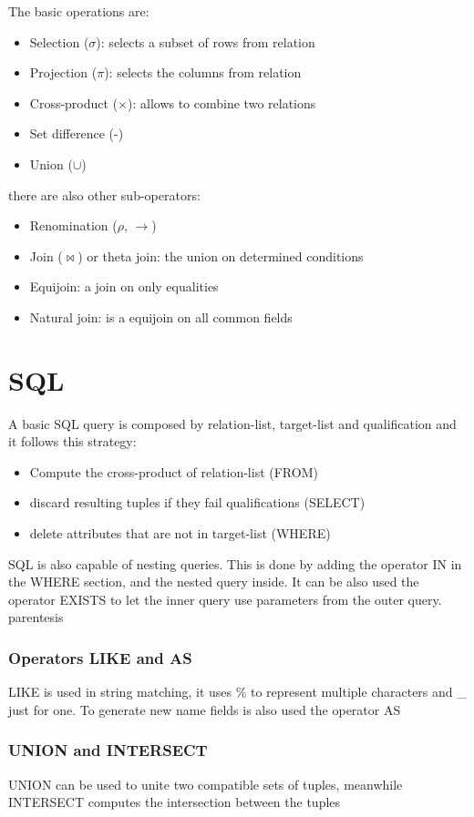 \documentclass[12pt, a4paper]{article}
\begin{document}
The basic operations are:
\begin{itemize}
    \item Selection ($\sigma$): selects a subset of rows from relation 
    \item Projection ($\pi$): selects the columns from relation
    \item Cross-product ($\times$): allows to combine two relations
    \item Set difference (-) 
    \item Union ($\cup$)
\end{itemize}
there are also other sub-operators:
\begin{itemize}
    \item Renomination ($\rho$, $\rightarrow$)
    \item Join ($\Join$) or theta join: the union on determined conditions
    \item Equijoin: a join on only equalities
    \item Natural join: is a equijoin on all common fields
\end{itemize}

\newpage
\section{SQL}
A basic SQL query is composed by relation-list, target-list and qualification and it follows this strategy:
\begin{itemize}
    \item Compute the cross-product of relation-list (FROM)
    \item discard resulting tuples if they fail qualifications (SELECT)
    \item delete attributes that are not in target-list (WHERE)
\end{itemize}
SQL is also capable of nesting queries. This is done by adding the operator IN in the WHERE section, and the nested 
query inside. It can be also used the operator EXISTS to let the inner query use parameters from the outer query. 
parentesis

\subsubsection{Operators LIKE and AS}
LIKE is used in string matching, it uses \% to represent multiple characters and \_ just for one. To generate new
name fields is also used the operator AS

\subsubsection{UNION and INTERSECT} 
UNION can be used to unite two compatible sets of tuples, meanwhile INTERSECT computes the intersection between the
tuples
\end{document}
